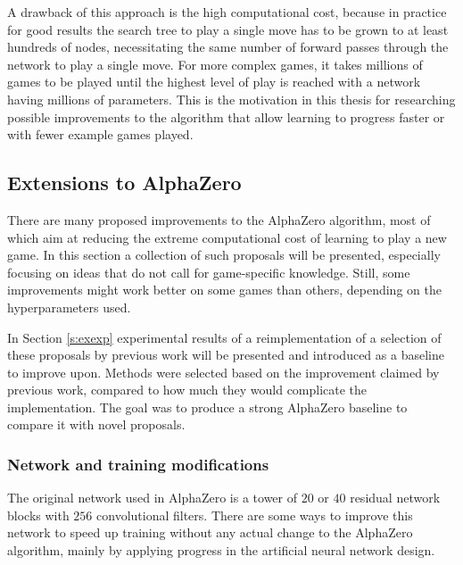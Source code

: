 \documentclass[12pt,onecolumn,oneside,titlepage]{article}
\begin{document}
A drawback of this approach is the high computational cost, because in practice for good results the search tree to play a single move has to be grown to at least hundreds of nodes, 
necessitating the same number of forward passes through the network to play a single move.
For more complex games, it takes millions of games to be played until the highest level of play is reached with a network having millions of parameters.
This is the motivation in this thesis for researching possible improvements to the algorithm that allow learning to progress
faster or with fewer example games played.

\subsection{Extensions to AlphaZero} \label{s:prev_extensions}

There are many proposed improvements to the AlphaZero algorithm, most of which aim at reducing the extreme computational cost of learning to play a new game.
In this section a collection of such proposals will be presented, especially focusing on ideas that do not call for game-specific knowledge. Still, some improvements might work better on some games than others,
depending on the hyperparameters used. 

In Section \ref{s:exexp} experimental results of a reimplementation of a selection of these proposals by previous work will be presented and introduced as a baseline to improve upon.
Methods were selected based on the improvement claimed by previous work, compared to how much they would
complicate the implementation. The goal was to produce a strong AlphaZero baseline to compare it with novel proposals.

\subsubsection{Network and training modifications}

The original network used in AlphaZero is a tower of $20$ or $40$ residual network blocks with $256$ convolutional filters. There are some ways to improve this network to speed up training without any
actual change to the AlphaZero algorithm, mainly by applying progress in the artificial neural network design.
\end{document}
